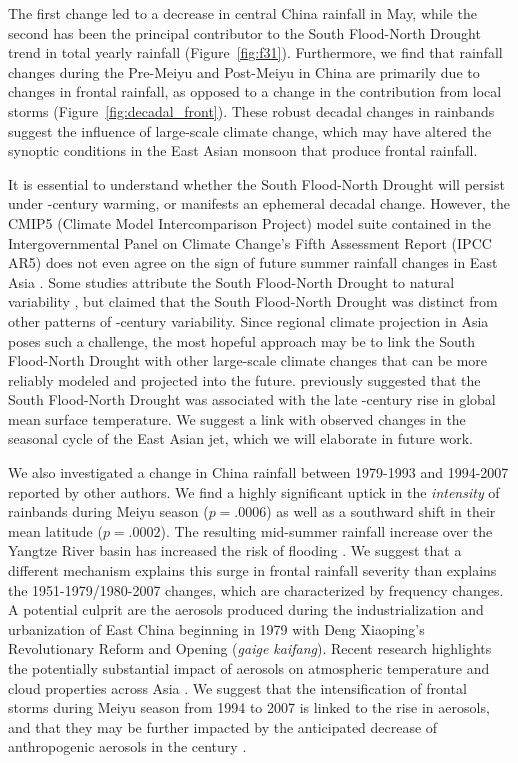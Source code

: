 \documentclass{ametsoc}
\begin{document}
	The first change led to a decrease in central China rainfall in May, while the second has been the principal contributor to the South Flood-North Drought trend in total yearly rainfall (Figure~\ref{fig:f31}). Furthermore, we find that rainfall changes during the Pre-Meiyu and Post-Meiyu in China are primarily due to changes in frontal rainfall, as opposed to a change in the contribution from local storms (Figure~\ref{fig:decadal_front}). These robust decadal changes in rainbands suggest the influence of large-scale climate change, which may have altered the synoptic conditions in the East Asian monsoon that produce frontal rainfall.
		
	It is essential to understand whether the South Flood-North Drought will persist under -century warming, or manifests an ephemeral decadal change. However, the CMIP5 (Climate Model Intercomparison Project) model suite contained in the Intergovernmental Panel on Climate Change's Fifth Assessment Report (IPCC AR5) does not even agree on the sign of future summer rainfall changes in East Asia \citep{Christensen2011}. Some studies attribute the South Flood-North Drought to natural variability \citep{Zhang1999,Xin2006,Lei2014}, but \citet{Zhou2009} claimed that the South Flood-North Drought was distinct from other patterns of -century variability. Since regional climate projection in Asia poses such a challenge, the most hopeful approach may be to link the South Flood-North Drought with other large-scale climate changes that can be more reliably modeled and projected into the future. \citet{Zhao2010} previously suggested that the South Flood-North Drought was associated with the late -century rise in global mean surface temperature. We suggest a link with observed changes in the seasonal cycle of the East Asian jet, which we will elaborate in future work.
		
	We also investigated a change in China rainfall between 1979-1993 and 1994-2007 reported by other authors. We find a highly significant uptick in the \textit{intensity} of rainbands during Meiyu season ($p=.0006$) as well as a southward shift in their mean latitude ($p=.0002$). The resulting mid-summer rainfall increase over the Yangtze River basin has increased the risk of flooding \citep{Gemmer2008}. We suggest that a different mechanism explains this surge in frontal rainfall severity than explains the 1951-1979/1980-2007 changes, which are characterized by frequency changes. A potential culprit are the aerosols produced during the industrialization and urbanization of East China beginning in 1979 with Deng Xiaoping's Revolutionary Reform and Opening (\textit{gaige kaifang}). Recent research highlights the potentially substantial impact of aerosols on atmospheric temperature and cloud properties across Asia \citep{Menon2002,Fan2012,Streets2013}. We suggest that the intensification of frontal storms during Meiyu season from 1994 to 2007 is linked to the rise in aerosols, and that they may be further impacted by the anticipated decrease of anthropogenic aerosols in the  century \citep{Westervelt2015}.
		
\end{document}
